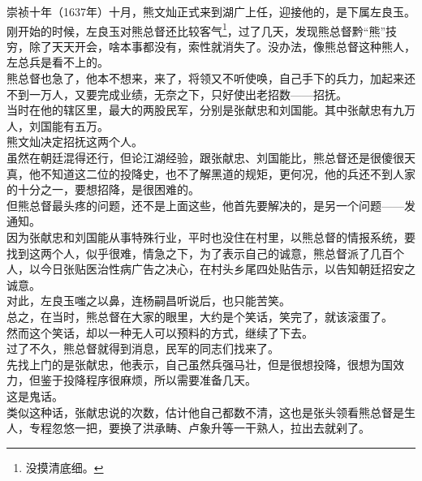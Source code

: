 \begin{multicols}{\theparacolNo}
崇祯十年（1637年）十月，熊文灿正式来到湖广上任，迎接他的，是下属左良玉。\\

刚开始的时候，左良玉对熊总督还比较客气\footnote{没摸清底细。}，过了几天，发现熊总督黔“熊”技穷，除了天天开会，啥本事都没有，索性就消失了。没办法，像熊总督这种熊人，左总兵是看不上的。\\

熊总督也急了，他本不想来，来了，将领又不听使唤，自己手下的兵力，加起来还不到一万人，又要完成业绩，无奈之下，只好使出老招数——招抚。\\

当时在他的辖区里，最大的两股民军，分别是张献忠和刘国能。其中张献忠有九万人，刘国能有五万。\\

熊文灿决定招抚这两个人。\\

虽然在朝廷混得还行，但论江湖经验，跟张献忠、刘国能比，熊总督还是很傻很天真，他不知道这二位的投降史，也不了解黑道的规矩，更何况，他的兵还不到人家的十分之一，要想招降，是很困难的。\\

但熊总督最头疼的问题，还不是上面这些，他首先要解决的，是另一个问题——发通知。\\

因为张献忠和刘国能从事特殊行业，平时也没住在村里，以熊总督的情报系统，要找到这两个人，似乎很难，情急之下，为了表示自己的诚意，熊总督派了几百个人，以今日张贴医治性病广告之决心，在村头乡尾四处贴告示，以告知朝廷招安之诚意。\\

对此，左良玉嗤之以鼻，连杨嗣昌听说后，也只能苦笑。\\

总之，在当时，熊总督在大家的眼里，大约是个笑话，笑完了，就该滚蛋了。\\

然而这个笑话，却以一种无人可以预料的方式，继续了下去。\\

过了不久，熊总督就得到消息，民军的同志们找来了。\\

先找上门的是张献忠，他表示，自己虽然兵强马壮，但是很想投降，很想为国效力，但鉴于投降程序很麻烦，所以需要准备几天。\\

这是鬼话。\\

类似这种话，张献忠说的次数，估计他自己都数不清，这也是张头领看熊总督是生人，专程忽悠一把，要换了洪承畴、卢象升等一干熟人，拉出去就剁了。\\


\end{multicols}
